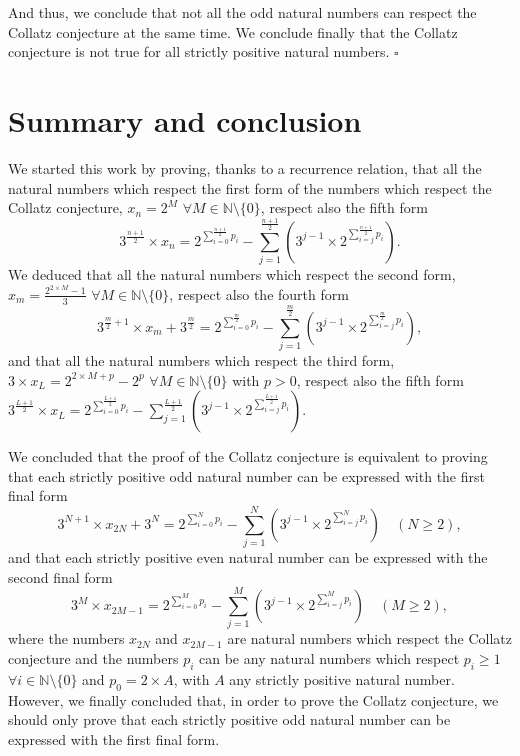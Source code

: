\documentclass[11pt,a4paper]{article}
\newcommand{\N}{\mathbb{N}}
\newcommand{\Pf}[4]{2^{\sum_{#4=0}^{#1}#3_{#4}}-\sum_{j=1}^{#2}\left(3^{j-1}\times 2^{\sum_{#4=j}^{#1}#3_{#4}}\right)}
\theoremstyle{definition}
\begin{document}
And thus, we conclude that not all the odd natural numbers can respect the Collatz
conjecture at the same time. We conclude finally that the Collatz conjecture is not true for
all strictly positive natural numbers. \hfill$\square$

\section{Summary and conclusion}
We started this work by proving, thanks to a recurrence relation, that all the natural
numbers which respect the first form of the numbers which respect the Collatz conjecture,
$x_n=2^{M}$ $\forall M\in\N\setminus\{0\}$, respect also the fifth form
\[3^{\frac{n+1}{2}}\times x_n=\Pf{\frac{n+1}{2}}{\frac{n+1}{2}}{p}{i}.\]
We deduced that all the natural numbers which respect the second form,
$x_m=\frac{2^{2\times M}-1}{3}$ $\forall M\in\N\setminus\{0\}$, respect also the fourth form
\[3^{\frac m2+1}\times x_m+3^{\frac m2}=\Pf{\frac m2}{\frac m2}{p}{i},\]
and that all the natural numbers which respect the third form,
$3\times x_L=2^{2\times M+p}-2^{p}$ $\forall M\in\N\setminus\{0\}$ with $p>0$, respect also
the fifth form $3^{\frac{L+1}{2}}\times x_L=\Pf{\frac{L+1}{2}}{\frac{L+1}{2}}{p}{i}$.

We concluded that the proof of the Collatz conjecture is equivalent to proving that each
strictly positive odd natural number can be expressed with the first final form
\[3^{N+1}\times x_{2N}+3^{N}=\Pf{N}{N}{p}{i}\quad(N\ge 2),\]
and that each strictly positive even natural number can be expressed with the second final
form
\[3^{M}\times x_{2M-1}=\Pf{M}{M}{p}{i}\quad(M\ge 2),\]
where the numbers $x_{2N}$ and $x_{2M-1}$ are natural numbers which respect the Collatz
conjecture and the numbers $p_i$ can be any natural numbers which respect $p_i\ge 1$
$\forall i\in\N\setminus\{0\}$ and $p_0=2\times A$, with $A$ any strictly positive natural
number. However, we finally concluded that, in order to prove the Collatz conjecture, we
should only prove that each strictly positive odd natural number can be expressed with the
first final form.
\end{document}
